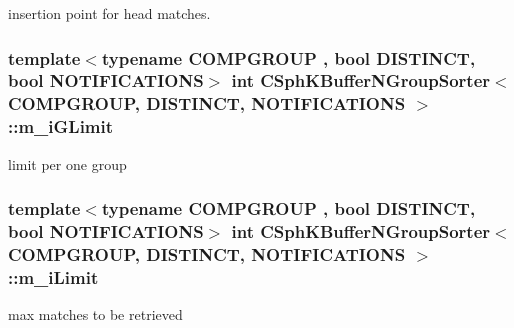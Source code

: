 insertion point for head matches. 

\hypertarget{classCSphKBufferNGroupSorter_a9c0663323613d107bbfd847c56cf4e6b}{
\subsubsection[{m\-\_\-i\-G\-Limit}]{\setlength{\rightskip}{0pt plus 5cm}template$<$typename C\-O\-M\-P\-G\-R\-O\-U\-P , bool D\-I\-S\-T\-I\-N\-C\-T, bool N\-O\-T\-I\-F\-I\-C\-A\-T\-I\-O\-N\-S$>$ {\bf int} {\bf C\-Sph\-K\-Buffer\-N\-Group\-Sorter}$<$ C\-O\-M\-P\-G\-R\-O\-U\-P, D\-I\-S\-T\-I\-N\-C\-T, N\-O\-T\-I\-F\-I\-C\-A\-T\-I\-O\-N\-S $>$\-::m\-\_\-i\-G\-Limit\hspace{0.3cm}{\ttfamily [protected]}}}\label{classCSphKBufferNGroupSorter_a9c0663323613d107bbfd847c56cf4e6b}


limit per one group 

\hypertarget{classCSphKBufferNGroupSorter_a51168c4d12cf65a9674f1d5bcdf45946}{
\subsubsection[{m\-\_\-i\-Limit}]{\setlength{\rightskip}{0pt plus 5cm}template$<$typename C\-O\-M\-P\-G\-R\-O\-U\-P , bool D\-I\-S\-T\-I\-N\-C\-T, bool N\-O\-T\-I\-F\-I\-C\-A\-T\-I\-O\-N\-S$>$ {\bf int} {\bf C\-Sph\-K\-Buffer\-N\-Group\-Sorter}$<$ C\-O\-M\-P\-G\-R\-O\-U\-P, D\-I\-S\-T\-I\-N\-C\-T, N\-O\-T\-I\-F\-I\-C\-A\-T\-I\-O\-N\-S $>$\-::m\-\_\-i\-Limit\hspace{0.3cm}{\ttfamily [protected]}}}\label{classCSphKBufferNGroupSorter_a51168c4d12cf65a9674f1d5bcdf45946}


max matches to be retrieved 

